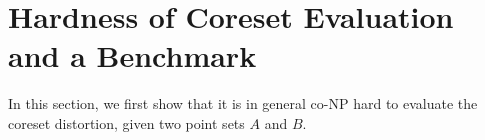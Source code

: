 \section{Hardness of Coreset Evaluation and a Benchmark}

In this section, we first show that it is in general co-NP hard to evaluate the coreset distortion, given two point sets $A$ and $B$.